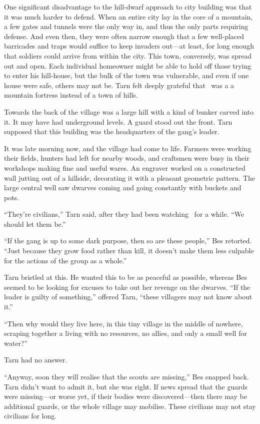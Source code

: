 One significant disadvantage to the hill-dwarf approach to city building was that it was much harder to defend.  When an entire city lay in the core of a mountain, a few gates and tunnels were the only way in, and thus the only parts requiring defense.  And even then, they were often narrow enough that a few well-placed barricades and traps would suffice to keep invaders out---at least, for long enough that soldiers could arrive from within the city.  This town, conversely, was spread out and open.  Each individual homeowner might be able to hold off those trying to enter his hill-house, but the bulk of the town was vulnerable, and even if one house were safe, others may not be.  Tarn felt deeply grateful that \korbarthrond\ was a a mountain fortress instead of a town of hills.

Towards the back of the village was a large hill with a kind of bunker carved into it.  It may have had underground levels.  A guard stood out the front.  Tarn supposed that this building was the headquarters of the gang's leader.

It was late morning now, and the village had come to life.  Farmers were working their fields, hunters had left for nearby woods, and craftsmen were busy in their workshops making fine and useful wares.  An engraver worked on a constructed wall jutting out of a hillside, decorating it with a pleasant geometric pattern.  The large central well saw dwarves coming and going constantly with buckets and pots.

``They're civilians,'' Tarn said, after they had been watching \tholkunrond\ for a while.  ``We should let them be.''

``If the gang is up to some dark purpose, then so are these people,'' Bes retorted.  ``Just because they grow food rather than kill, it doesn't make them less culpable for the actions of the group as a whole.''

Tarn bristled at this.  He wanted this to be as peaceful as possible, whereas Bes seemed to be looking for excuses to take out her revenge on the dwarves.  ``If the leader is guilty of something,'' offered Tarn, ``these villagers may not know about it.''

``Then why would they live here, in this tiny village in the middle of nowhere, scraping together a living with no resources, no allies, and only a small well for water?''

Tarn had no answer.

``Anyway, soon they will realise that the scouts are missing,'' Bes snapped back.  Tarn didn't want to admit it, but she was right.  If news spread that the guards were missing---or worse yet, if their bodies were discovered---then there may be additional guards, or the whole village may mobilise.  These civilians may not stay civilians for long.

